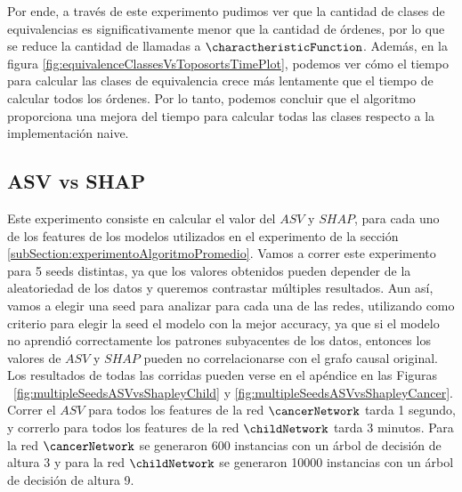 Por ende, a través de este experimento pudimos ver que la cantidad de clases de equivalencias es significativamente menor que la cantidad de órdenes, por lo que se reduce la cantidad de llamadas a $\charactheristicFunction$. Además, en la figura \ref{fig:equivalenceClassesVsToposortsTimePlot}, podemos ver cómo el tiempo para calcular las clases de equivalencia crece más lentamente que el tiempo de calcular todos los órdenes. Por lo tanto, podemos concluir que el algoritmo proporciona una mejora del tiempo para calcular todas las clases respecto a la implementación naive.

\subsection{ASV vs SHAP}


Este experimento consiste en calcular el valor del $ASV$ y $SHAP$, para cada uno de los features de los modelos utilizados en el experimento de la sección \ref{subSection:experimentoAlgoritmoPromedio}. Vamos a correr este experimento para 5 seeds distintas, ya que los valores obtenidos pueden depender de la aleatoriedad de los datos y queremos contrastar múltiples resultados. Aun así, vamos a elegir una seed para analizar para cada una de las redes, utilizando como criterio para elegir la seed el modelo con la mejor accuracy, ya que si el modelo no aprendió correctamente los patrones subyacentes de los datos, entonces los valores de $ASV$ y $SHAP$ pueden no correlacionarse con el grafo causal original. Los resultados de todas las corridas pueden verse en el apéndice en las Figuras ~\ref{fig:multipleSeedsASVvsShapleyChild} y \ref{fig:multipleSeedsASVvsShapleyCancer}. Correr el $ASV$ para todos los features de la red $\cancerNetwork$ tarda 1 segundo, y correrlo para todos los features de la red $\childNetwork$ tarda 3 minutos. Para la red $\cancerNetwork$ se generaron 600 instancias con un árbol de decisión de altura 3 y para la red $\childNetwork$ se generaron 10000 instancias con un árbol de decisión de altura 9.


